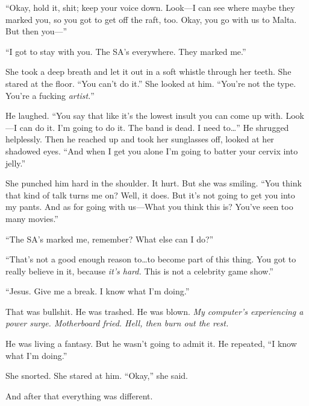 ``Okay, hold it, shit; keep your voice down. Look---I can see where maybe they marked you, so you got to get off the raft, too. Okay, you go with us to Malta. But then you---''

``I got to stay with you. The SA's everywhere. They marked me.''

She took a deep breath and let it out in a soft whistle through her teeth. She stared at the floor. ``You can't do it.'' She looked at him. ``You're not the type. You're a fucking \textit{artist.}''

He laughed. ``You say that like it's the lowest insult you can come up with. Look---I can do it. I'm going to do it. The band is dead. I need to\ldots '' He shrugged helplessly. Then he reached up and took her sunglasses off, looked at her shadowed eyes. ``And when I get you alone I'm going to batter your cervix into jelly.''

She punched him hard in the shoulder. It hurt. But she was smiling. ``You think that kind of talk turns me on? Well, it does. But it's not going to get you into my pants. And as for going with us---What you think this is? You've seen too many movies.''

``The SA's marked me, remember? What else can I do?''

``That's not a good enough reason to\ldots to become part of this thing. You got to really believe in it, because \textit{it's hard.} This is not a celebrity game show.''

``Jesus. Give me a break. I know what I'm doing.''

That was bullshit. He was trashed. He was blown. \textit{My computer's experiencing a power surge. Motherboard fried. Hell, then burn out the rest.}

He was living a fantasy. But he wasn't going to admit it. He repeated, ``I know what I'm doing.''

She snorted. She stared at him. ``Okay,'' she said.

And after that everything was different.
